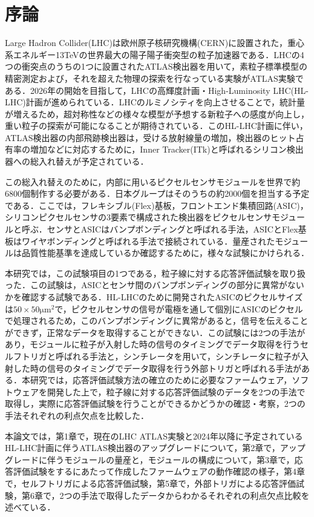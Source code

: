 \chapter*{序論}
Large Hadron Collider(LHC)は欧州原子核研究機構(CERN)に設置された，重心系エネルギー13TeVの世界最大の陽子陽子衝突型の粒子加速器である．LHCの4つの衝突点のうちの1つに設置されたATLAS検出器を用いて，素粒子標準模型の精密測定および，それを超えた物理の探索を行なっている実験がATLAS実験である．2026年の開始を目指して，LHCの高輝度計画・High-Luminosity LHC(HL-LHC)計画が進められている．LHCのルミノシティを向上させることで，統計量が増えるため，超対称性などの様々な模型が予想する新粒子への感度が向上し，重い粒子の探索が可能になることが期待されている．このHL-LHC計画に伴い，ATLAS検出器の内部飛跡検出器は，受ける放射線量の増加，検出器のヒット占有率の増加などに対応するために，Inner Tracker(ITk)と呼ばれるシリコン検出器への総入れ替えが予定されている．\par
この総入れ替えのために，内部に用いるピクセルセンサモジュールを世界で約6800個制作する必要がある．日本グループはそのうちの約2000個を担当する予定である．ここでは，フレキシブル(Flex)基板，フロントエンド集積回路(ASIC)，シリコンピクセルセンサの3要素で構成された検出器をピクセルセンサモジュールと呼ぶ．センサとASICはバンプボンディングと呼ばれる手法，ASICとFlex基板はワイヤボンディングと呼ばれる手法で接続されている．量産されたモジュールは品質性能基準を達成しているか確認するために，様々な試験にかけられる．\par
本研究では，この試験項目の1つである，粒子線に対する応答評価試験を取り扱った．この試験は，ASICとセンサ間のバンプボンディングの部分に異常がないかを確認する試験である．HL-LHCのために開発されたASICのピクセルサイズは$50\times50 \mathrm{\mu m^2}$で，ピクセルセンサの信号が電極を通して個別にASICのピクセルで処理されるため，このバンプボンディングに異常があると，信号を伝えることができず，正常なデータを取得することができない．この試験には2つの手法があり，モジュールに粒子が入射した時の信号のタイミングでデータ取得を行うセルフトリガと呼ばれる手法と，シンチレータを用いて，シンチレータに粒子が入射した時の信号のタイミングでデータ取得を行う外部トリガと呼ばれる手法がある．本研究では，応答評価試験方法の確立のために必要なファームウェア，ソフトウェアを開発した上で，粒子線に対する応答評価試験のデータを2つの手法で取得し，実際に応答評価試験を行うことができるかどうかの確認・考察，2つの手法それぞれの利点欠点を比較した．\par
本論文では，第1章で，現在のLHC ATLAS実験と2024年以降に予定されているHL-LHC計画に伴うATLAS検出器のアップグレードについて，第2章で，アップグレードに伴うモジュールの量産と，モジュールの構成について，第3章で，応答評価試験をするにあたって作成したファームウェアの動作確認の様子，第4章で，セルフトリガによる応答評価試験，第5章で，外部トリガによる応答評価試験，第6章で，2つの手法で取得したデータからわかるそれぞれの利点欠点比較を述べている．
